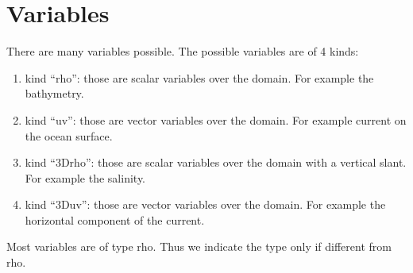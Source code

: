 \documentclass[12pt]{amsart}
\begin{document}
\section{Variables}

There are many variables possible. The possible variables are of 4 kinds:
\begin{enumerate}
\item kind ``rho'': those are scalar variables over the domain. For example the bathymetry.
\item kind ``uv'': those are vector variables over the domain. For example current on the ocean surface.
\item kind ``3Drho'': those are scalar variables over the domain with a vertical slant. For example the salinity.
\item kind ``3Duv'': those are vector variables over the domain. For example the horizontal component of the current.
\end{enumerate}
Most variables are of type rho. Thus we indicate the type only if different from rho.
\end{document}
